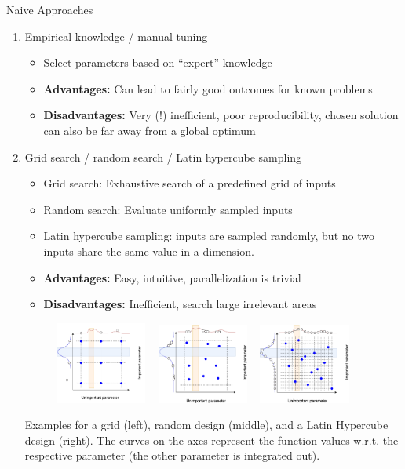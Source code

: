 \documentclass[11pt,compress,t,notes=noshow, xcolor=table]{beamer}
\begin{document}
\begin{vbframe}{Naive Approaches}
\begin{enumerate}
\item Empirical knowledge / manual tuning
\begin{itemize}
\item Select parameters based on \enquote{expert} knowledge 
\item \textbf{Advantages:} Can lead to fairly good outcomes for known problems
\item \textbf{Disadvantages:} Very (!) inefficient, poor reproducibility, chosen solution can also be far away from a global optimum
\end{itemize}

\framebreak 
\item Grid search / random search / Latin hypercube sampling
\begin{itemize}
\item Grid search: Exhaustive search of a predefined grid of inputs
\item Random search: Evaluate uniformly sampled inputs 
\item Latin hypercube sampling: inputs are sampled randomly, but no two inputs share the same value in a dimension. 
\item \textbf{Advantages: } Easy, intuitive, parallelization is trivial
\item \textbf{Disadvantages: } Inefficient, search large irrelevant areas
\end{itemize}

\begin{center}
\begin{figure}
\includegraphics[width = 3cm]{figure_man/01_GridSearch.png} ~ \includegraphics[width = 3cm]{figure_man/02_RandomSearch.png} ~ \includegraphics[width = 3cm]{figure_man/03_LatHypercube.png}
\end{figure}
\begin{footnotesize}
  Examples for a grid (left), random design (middle), and a Latin Hypercube design (right). The curves on the axes represent the function values w.r.t. the respective parameter (the other parameter is integrated out). 
\end{footnotesize}
\end{center}



\end{enumerate}
\end{vbframe}
\end{document}
